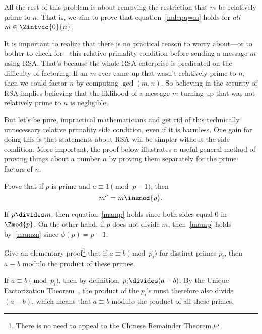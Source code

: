 \begin{problem}
\eparts All the rest of this problem is about removing the restriction
that $m$ be relatively prime to $n$.  That is, we aim to prove that
equation~\eqref{mdepq=m} holds for \emph{all} $m \in \Zintvco{0}{n}$.

It is important to realize that there is no practical reason to worry
about---or to bother to check for---this relative primality condition
before sending a message $m$ using RSA.  That's because the whole RSA
enterprise is predicated on the difficulty of factoring.  If an $m$
ever came up that wasn't relatively prime to $n$, then we could factor
$n$ by computing $\gcd(m,n)$.  So believing in the security of RSA
implies believing that the liklihood of a message $m$ turning up that
was not relatively prime to $n$ is negligible.

But let's be pure, impractical mathematicians and get rid of this
technically unnecessary relative primality side condition, even if it
is harmless.  One gain for doing this is that statements about RSA
will be simpler without the side condition.  More important, the proof
below illustrates a useful general method of proving things about a
number $n$ by proving them separately for the prime factors of $n$.

\bparts

\ppart\label{pma} Prove that if $p$ is prime and $a \equiv 1
\pmod{p-1}$, then
\begin{equation}\label{mamp}
m^a = m \inzmod{p}.
\end{equation}

\begin{solution}
If $p \divides m$, then equation~\eqref{mamp} holds since both sides
equal 0 in $\Zmod{p}$.  On the other hand, if $p$ does not divide
$m$, then~\eqref{mamp} holds by~\eqref{mamzn} since $\phi(p) = p-1$.
\end{solution}

\ppart\label{abp} Give an elementary proof\footnote{There is no need
  to appeal to the Chinese Remainder Theorem.} that if $a \equiv b
\pmod {p_i}$ for distinct primes $p_i$, then $a \equiv b$ modulo the
product of these primes.


\begin{solution}
If $a \equiv b \pmod {p_i}$, then by definition, $p_i \divides (a-b)$.
By the Unique Factorization Theorem~, the
product of the $p_i$'s must therefore also divide $(a-b)$, which means
that $a \equiv b$ modulo the product of all these primes.
\end{solution}


\end{problem}
